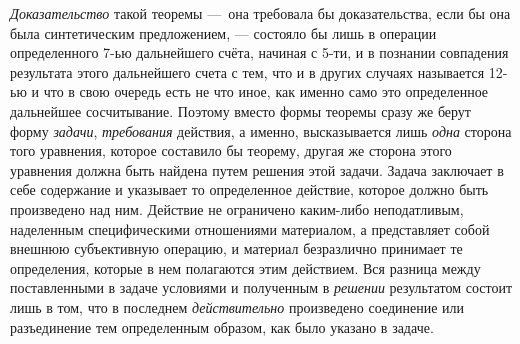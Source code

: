 \documentclass[twoside]{article}
\begin{document}
{{\em Доказательство} такой
теоремы —~она требовала бы доказательства, если бы она была
синтетическим предложением, — состояло бы лишь в операции
определенного 7-ью дальнейшего счёта, начиная с 5-ти, и в познании
совпадения результата этого дальнейшего счета с тем, что и в других случаях
называется 12-ью и что в свою очередь есть не что иное, как именно само это
определенное дальнейшее сосчитывание. Поэтому вместо формы теоремы сразу же
берут форму {\em задачи},
{\em требования} действия,
а именно, высказывается лишь {\em одна}
сторона того уравнения, которое составило бы теорему, другая
же сторона этого уравнения должна быть найдена путем решения этой задачи.
Задача заключает в себе содержание и указывает то определенное действие,
которое должно быть произведено над ним. Действие не ограничено каким-либо
неподатливым, наделенным специфическими отношениями материалом, а
представляет собой внешнюю субъективную операцию, и материал безразлично
принимает те определения, которые в нем полагаются этим действием. Вся
разница между поставленными в задаче условиями и полученным в
{\em решении} результатом
состоит лишь в том, что в последнем
{\em действительно}
произведено соединение или разъединение тем определенным
образом, как было указано в задаче.

}
\end{document}
